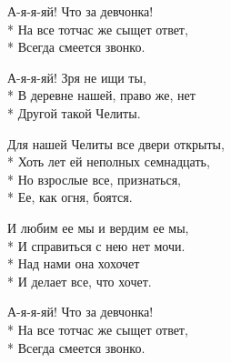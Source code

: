 \medskip

\begin{minipage}{\linewidth}
\hspace*{1.5em}А-я-я-яй! Что за девчонка!\\*
\hspace*{1.5em}На все тотчас же сыщет ответ,\\*
\hspace*{1.5em}Всегда смеется звонко.\\
\end{minipage}\par\medskip\nobreak

\medskip

\begin{minipage}{\linewidth}
\hspace*{1.5em}А-я-я-яй! Зря не ищи ты,\\*
\hspace*{1.5em}В деревне нашей, право же, нет\\*
\hspace*{1.5em}Другой такой Челиты.\\
\end{minipage}\par\medskip\nobreak

\medskip

\begin{minipage}{\linewidth}
Для нашей Челиты все двери открыты,\\*
Хоть лет ей неполных семнадцать,\\*
Но взрослые все, признаться,\\*
Ее, как огня, боятся.\\
\end{minipage}\par\medskip\nobreak

\medskip

\begin{minipage}{\linewidth}
И любим ее мы и вердим ее мы,\\*
И справиться с нею нет мочи.\\*
Над нами она хохочет\\*
И делает все, что хочет.\\
\end{minipage}\par\medskip\nobreak

\medskip

\begin{minipage}{\linewidth}
\hspace*{1.5em}А-я-я-яй! Что за девчонка!\\*
\hspace*{1.5em}На все тотчас же сыщет ответ,\\*
\hspace*{1.5em}Всегда смеется звонко.\\
\end{minipage}\par\medskip\nobreak

